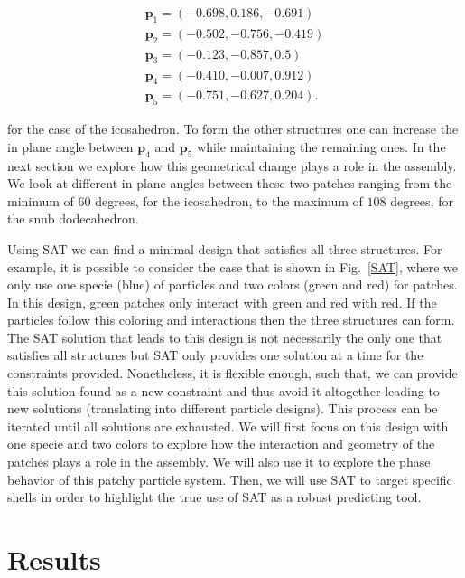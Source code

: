\documentclass[a4paper, amsfonts, amssymb, amsmath, reprint, showkeys, nofootinbib, twoside]{revtex4-1}
\begin{document}
\begin{equation}
    \label{patch}
    \begin{aligned}
    \textbf{p}_1=(-0.698, 0.186, -0.691) \\
    \textbf{p}_2=(-0.502, -0.756, -0.419) \\
    \textbf{p}_3=(-0.123, -0.857, 0.5) \\ 
    \textbf{p}_4=(-0.410, -0.007, 0.912) \\
    \textbf{p}_5=(-0.751, -0.627, 0.204) .
    \end{aligned}
\end{equation}

\noindent for the case of the icosahedron. To form the other structures one can increase the in plane angle between $\textbf{p}_4$ and $\textbf{p}_5$ while maintaining the remaining ones. In the next section we explore how this geometrical change plays a role in the assembly. We look at different in plane angles between these two patches ranging from the minimum of $60$ degrees, for the icosahedron, to the maximum of $108$ degrees, for the snub dodecahedron.

Using SAT we can find a minimal design that satisfies all three structures. For example, it is possible to consider the case that is shown in Fig.~\ref{SAT}, where we only use one specie (blue) of particles and two colors (green and red) for patches. In this design, green patches only interact with green and red with red. If the particles follow this coloring and interactions then the three structures can form. The SAT solution that leads to this design is not necessarily the only one that satisfies all structures but SAT only provides one solution at a time for the constraints provided. Nonetheless, it is flexible enough, such that, we can provide this solution found as a new constraint and thus avoid it altogether leading to new solutions (translating into different particle designs). This process can be iterated until all solutions are exhausted. We will first focus on this design with one specie and two colors to explore how the interaction and geometry of the patches plays a role in the assembly. We will also use it to explore the phase behavior of this patchy particle system. Then, we will use SAT to target specific shells in order to highlight the true use of SAT as a robust predicting tool.

\section{Results}
\end{document}
